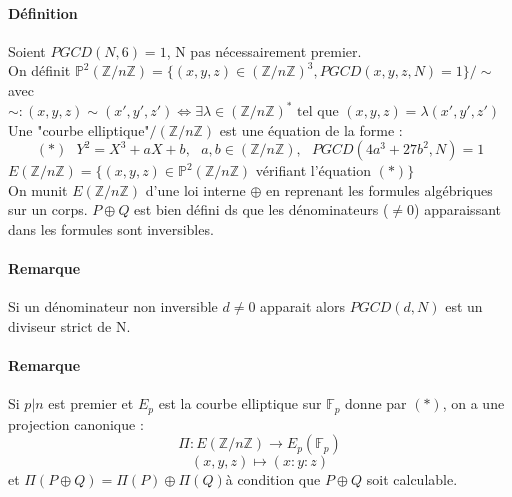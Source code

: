 \documentclass[12pt,a4paper]{report}
\begin{document}
\paragraph{Définition\\}
Soient $PGCD(N,6)=1$, N pas nécessairement premier.\\
On définit $\mathbb{P}^2 (\mathbb{Z}/n\mathbb{Z}) = \{ (x,y,z) \in (\mathbb{Z}/n\mathbb{Z})^3, PGCD(x,y,z,N)=1\}/\sim$\\
 avec $\sim : (x,y,z)\sim (x',y',z') \Leftrightarrow \exists \lambda \in (\mathbb{Z}/n\mathbb{Z})^{*} \mbox{ tel que } (x,y,z) = \lambda (x',y',z')$\\
Une "courbe elliptique"$/(\mathbb{Z}/n\mathbb{Z})$ est une équation de la forme :
$$ (*) \mbox{  } Y^2 = X^3 +aX +b, \mbox{ } a,b \in (\mathbb{Z}/n\mathbb{Z}),  \mbox{ } PGCD(4a^3+27b^2,N) = 1$$
$E(\mathbb{Z}/n\mathbb{Z}) = \{ (x,y,z) \in \mathbb{P}^2 (\mathbb{Z}/n\mathbb{Z})$ vérifiant l'équation $(*) \}$\\
On munit $E(\mathbb{Z}/n\mathbb{Z})$ d'une loi interne $\oplus$ en reprenant les formules algébriques sur un corps. $P\oplus Q$ est bien défini ds que les dénominateurs ($\neq 0$) apparaissant dans les formules sont inversibles.
\paragraph{Remarque \\}
Si un dénominateur non inversible $d\neq 0$ apparait alors $PGCD(d,N)$ est un diviseur strict de N.
\paragraph{Remarque\\}
Si $p|n$ est premier et $E_p$ est la courbe elliptique sur $\mathbb{F}_p$ donne par $(*)$, on a une projection canonique :
$$ \Pi : E(\mathbb{Z}/n\mathbb{Z}) \longrightarrow E_p(\mathbb{F}_p) $$
$$ (x,y,z) \longmapsto (x:y:z)$$
et $ \Pi (P \oplus Q) = \Pi(P) \oplus \Pi(Q)$à condition que $ P\oplus Q$ soit calculable.
\end{document}
